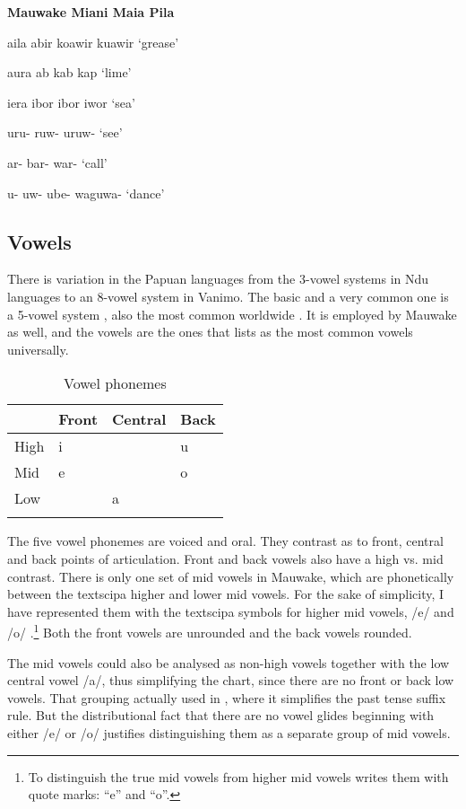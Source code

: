 {\bfseries
Mauwake  Miani  Maia  Pila}

a{\textphi}ila  abir  koawir  kuawir  `grease'

a{\textphi}ura  ab  kab  kap  `lime'

i{\textphi}era  ibor  ibor  iwor  `sea'

uru{\textphi}-  ruw-  uruw-    `see'

{\textphi}ar-  bar-  war-    `call'

u{\textphi}-    uw-  ube-  waguwa-  `dance'

\subsection{Vowels}


There is variation in the Papuan languages from the 3-vowel systems in Ndu languages to an 8-vowel system in Vanimo. The basic and a very common one is a 5-vowel system \citep[49--54]{Foley1986}, also the most common worldwide \citep[126]{Maddieson1984}.  It is employed by Mauwake as well, and the vowels are the ones that \citet[125]{Maddieson1984} lists as the most common vowels universally. 
 
\begin{table}
\caption{Vowel phonemes}
\label{tab:3:vowelphonemes}
\begin{tabular}{llll}
\mytoprule
& Front & Central & Back\\
\midrule
High & i &  & u\\
Mid & e &  & o\\
Low &  & a & \\
\mybottomrule
\end{tabular}
\end{table}


The five vowel phonemes are voiced and oral. They contrast as to front, central and back points of articulation. Front and back vowels also have a high vs. mid contrast. There is only one set of mid vowels in Mauwake, which are phonetically between the textsc{ipa} higher and lower mid vowels.  For the sake of simplicity, I have represented them with the textsc{ipa} symbols for higher mid vowels, /e/ and /o/ .\footnote{To distinguish the true mid vowels from higher mid vowels \citet[123]{Maddieson1984} writes them with quote marks: ``e'' and ``o''.}  Both the front vowels are unrounded and the back vowels rounded.

The mid vowels could also be analysed as non-high vowels together with the low central vowel /a/, thus simplifying the chart, since there are no front or back low vowels. That grouping  actually used in , where it simplifies the past tense suffix rule. But the distributional fact that there are no vowel glides beginning with either /e/ or /o/ justifies distinguishing them as a separate group of mid vowels.  

